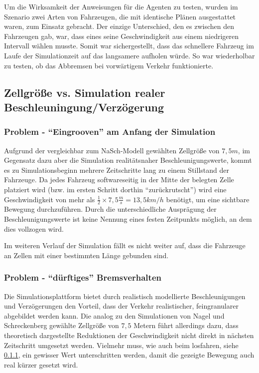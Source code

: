 Um die Wirksamkeit der Anweisungen für die Agenten zu testen, wurden im Szenario zwei Arten von Fahrzeugen, die mit identische Plänen ausgestattet waren, zum Einsatz gebracht.
Der einzige Unterschied, den es zwischen den Fahrzeugen gab, war, dass eines seine Geschwindigkeit aus einem niedrigeren Intervall wählen musste.
Somit war sichergestellt, dass das schnellere Fahrzeug im Laufe der Simulationzeit auf das langsamere aufholen würde.
So war wiederholbar zu testen, ob das Abbremsen bei vorwärtigem Verkehr funktionierte.



\subsection{Zellgröße vs. Simulation realer Beschleuningung/Verzögerung}

\subsubsection{Problem - \enquote{Eingrooven} am Anfang der Simulation}
\label{sec:accelerategroove}

Aufgrund der vergleichbar zum NaSch-Modell gewählten Zellgröße von $7,5 m$, im Gegensatz dazu aber die Simulation realitätsnaher Beschleunigungswerte, kommt es zu Simulationsbeginn mehrere Zeitschritte lang zu einem Stillstand der Fahrzeuge.
Da jedes Fahrzeug softwareseitig in der Mitte der belegten Zelle platziert wird (bzw. im ersten Schritt dorthin \enquote{zurückrutscht}) wird eine Geschwindigkeit von mehr als $ \frac{1}{2} \times 7,5 \frac{m}{s} = 13,5 km/h$ benötigt, um eine sichtbare Bewegung durchzuführen.
Durch die unterschiedliche Ausprägung der Beschleunigungswerte ist keine Nennung eines festen Zeitpunkts möglich, an dem dies vollzogen wird.

Im weiteren Verlauf der Simulation fällt es nicht weiter auf, dass die Fahrzeuge an Zellen mit einer bestimmten Länge gebunden sind.



\subsubsection{Problem - \enquote{dürftiges} Bremsverhalten}
\label{sec:bremsverhalten}

Die Simulationsplattform bietet durch realistisch modellierte Beschleunigungen und Verzögerungen den Vorteil, dass der Verkehr realistischer, feingranularer abgebildet werden kann.
Die analog zu den Simulationen von Nagel und Schreckenberg gewählte Zellgröße von $7,5$ Metern führt allerdings dazu, dass theoretisch dargestellte Reduktionen der Geschwindigkeit nicht direkt in nächsten Zeitschritt umgesetzt werden.
Vielmehr muss, wie auch beim losfahren, siehe \cref{sec:accelerategroove}, ein gewisser Wert unterschritten werden, damit die gezeigte Bewegung auch real kürzer gesetzt wird.


